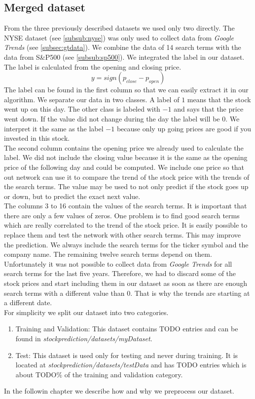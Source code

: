 \subsection{Merged dataset}
\label{subsec:merged}
From the three previously described datasets we used only two directly. The NYSE dataset (see \ref{subsub:nyse}) was only used to collect data from \textit{Google Trends} (see \ref{subsec:gtdata}). We combine the data of 14 search terms with the data from S\&P500 (see \ref{subsub:sp500}). We integrated the label in our dataset. The label is calculated from the opening and closing price.
\begin{equation}
y = sign(p_{close} - p_{open})
\end{equation}
The label can be found in the first column so that we can easily extract it in our algorithm. We separate our data in two classes. A label of $1$ means that the stock went up on this day. The other class is labeled with $-1$ and says that the price went down. If the value did not change during the day the label will be $0$. We interpret it the same as the label $-1$ because only up going prices are good if you invested in this stock.\\
The second column contains the opening price we already used to calculate the label. We did not include the closing value because it is the same as the opening price of the following day and could be computed. We include one price so that out network can use it to compare the trend of the stock price with the trends of the search terms. The value may be used to not only predict if the stock goes up or down, but to predict the exact next value.\\
The columns 3 to 16 contain the values of the search terms. It is important that there are only a few values of zeros. One problem is to find good search terms which are really correlated to the trend of the stock price. It is easily possible to replace them and test the network with other search terms. This may improve the prediction. We always include the search terms for the ticker symbol and the company name. The remaining twelve search terms depend on them.\\
Unfortunately it was not possible to collect data from \textit{Google Trends} for all search terms for the last five years. Therefore, we had to discard some of the stock prices and start including them in our dataset as soon as there are enough search terms with a different value than $0$. That is why the trends are starting at a different date.\\
For simplicity we split our dataset into two categories.
\begin{enumerate}
	\item Training and Validation: This dataset contains $\text{TODO}$ entries and can be found in \mbox{\textit{stockprediction/datasets/myDataset}}.
	\item Test: This dataset is used only for testing and never during training. It is located at \mbox{\textit{stockprediction/datasets/testData}} and has $\text{TODO}$ entries which is about $\text{TODO}\%$ of the training and validation category.
\end{enumerate}
In the followin chapter we describe how and why we preprocess our dataset.
